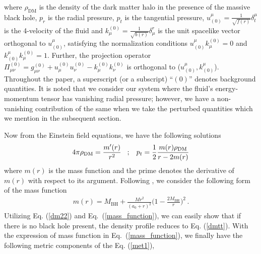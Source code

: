 \documentclass[11pt]{article}
\begin{document}
where  $\rho_{\textrm{DM}}$ is the density of the dark matter halo in the presence of the massive black hole, $p_{r}$ is the radial pressure, $p_{t}$ is the tangential pressure, $u^{\mu}_{(0)}=\frac{1}{\sqrt{f(r)}}\delta^{\mu}_{t}$ is the 4-velocity of the fluid and $k_{\mu}^{(0)}=\frac{1}{\sqrt{b(r)}}\delta^{r}_{\mu}$ is the unit spacelike vector orthogonal to $u^{\mu}_{(0)}$,  satisfying the normalization conditions  $u_{(0)}^{\mu}k_{\mu}^{(0)}=0$ and $k_{(0)}^{\mu}k_{\mu}^{(0)}=1$. Further, the projection operator $\Pi_{\mu\nu}^{(0)}=g_{\mu\nu}^{(0)}+u_{\mu}^{(0)}u_{\nu}^{(0)}-k_{\mu}^{(0)}k_{\nu}^{(0)}$ is orthogonal to ($u_{(0)}^{\mu},k_{(0)}^{\mu}$). Throughout the paper, a superscript (or a subscript) ``${(0)}$'' denotes background quantities. It is noted that we consider our system where the fluid's energy-momentum tensor has vanishing radial pressure; however, we have a non-vanishing contribution of the same when we take the perturbed quantities which we mention in the subsequent section. 

Now from the Einstein field equations, we have the following solutions
\begin{align}\label{dm22}
    4\pi\rho_{\textrm{DM}} = \frac{m'(r)}{r^{2}}
    \hspace{3mm} ; \hspace{3mm}  p_{t} = \frac{1}{2} \frac{m(r) \rho_{\textrm{DM}}}{r-2m(r)}
\end{align}
where  $m(r)$ is the mass function and the prime denotes the derivative of $m(r)$ with respect to its argument. Following \cite{PhysRevD.105.L061501}, we consider the following form of the mass function
\begin{align}\label{mass_function}
    m(r) = M_{\textrm{BH}} + \frac{M r^{2}}{(a_{0}+r)^{2}} \Big(1-\frac{2M_{\textrm{BH}}}{r}\Big)^{2}\,.
\end{align}
Utilizing Eq. (\ref{dm22}) and Eq.~(\ref{mass_function}), we can easily show that if there is no black hole present, the density profile reduces to Eq. (\ref{dmtt}). With the expression of mass function in Eq.~(\ref{mass_function}), we finally have the following metric components of the Eq. (\ref{met1}),
\end{document}
